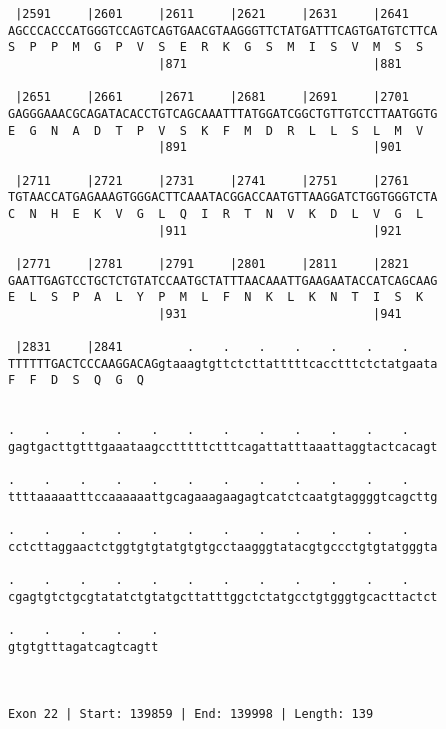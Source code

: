 \documentclass{article}
\begin{document}
\begin{Verbatim}
 |2591     |2601     |2611     |2621     |2631     |2641    
AGCCCACCCATGGGTCCAGTCAGTGAACGTAAGGGTTCTATGATTTCAGTGATGTCTTCA
S  P  P  M  G  P  V  S  E  R  K  G  S  M  I  S  V  M  S  S  
                     |871                          |881     
  
 |2651     |2661     |2671     |2681     |2691     |2701    
GAGGGAAACGCAGATACACCTGTCAGCAAATTTATGGATCGGCTGTTGTCCTTAATGGTG
E  G  N  A  D  T  P  V  S  K  F  M  D  R  L  L  S  L  M  V  
                     |891                          |901     
  
 |2711     |2721     |2731     |2741     |2751     |2761    
TGTAACCATGAGAAAGTGGGACTTCAAATACGGACCAATGTTAAGGATCTGGTGGGTCTA
C  N  H  E  K  V  G  L  Q  I  R  T  N  V  K  D  L  V  G  L  
                     |911                          |921     
  
 |2771     |2781     |2791     |2801     |2811     |2821    
GAATTGAGTCCTGCTCTGTATCCAATGCTATTTAACAAATTGAAGAATACCATCAGCAAG
E  L  S  P  A  L  Y  P  M  L  F  N  K  L  K  N  T  I  S  K  
                     |931                          |941     
  
 |2831     |2841         .    .    .    .    .    .    .    
TTTTTTGACTCCCAAGGACAGgtaaagtgttctcttatttttcacctttctctatgaata
F  F  D  S  Q  G  Q                                         
                                                            
  
.    .    .    .    .    .    .    .    .    .    .    .    
gagtgacttgtttgaaataagcctttttctttcagattatttaaattaggtactcacagt
                                                            
.    .    .    .    .    .    .    .    .    .    .    .    
ttttaaaaatttccaaaaaattgcagaaagaagagtcatctcaatgtaggggtcagcttg
                                                            
.    .    .    .    .    .    .    .    .    .    .    .    
cctcttaggaactctggtgtgtatgtgtgcctaagggtatacgtgccctgtgtatgggta
                                                            
.    .    .    .    .    .    .    .    .    .    .    .    
cgagtgtctgcgtatatctgtatgcttatttggctctatgcctgtgggtgcacttactct
                                                            
.    .    .    .    .
gtgtgtttagatcagtcagtt
                     
                     
 
Exon 22 | Start: 139859 | End: 139998 | Length: 139




\end{Verbatim}
\end{document}
